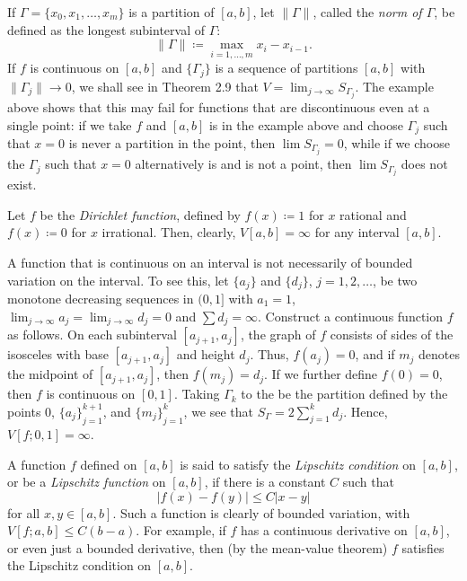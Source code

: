 If $\Gamma=\{x_0,x_1,\dotsc,x_m\}$ is a partition of $[a,b]$, let
$\|\Gamma\|$, called the \emph{norm of $\Gamma$}, be defined as the longest
subinterval of $\Gamma$:
\begin{equation}
\label{eq:eq:partition-norm}
\|\Gamma\|\coloneqq\max_{i=1,\dotsc,m} x_i-x_{i-1}.
\end{equation}
If $f$ is continuous on $[a,b]$ and $\{\Gamma_j\}$ is a sequence of
partitions $[a,b]$ with $\|\Gamma_j\|\to 0$, we shall see in Theorem 2.9
that $V=\lim_{j\to\infty} S_{\Gamma_j}$. The example above shows that this
may fail for functions that are discontinuous even at a single point: if we
take $f$ and $[a,b]$ is in the example above and choose $\Gamma_j$ such
that $x=0$ is never a partition in the point, then $\lim S_{\Gamma_j}=0$,
while if we choose the $\Gamma_j$ such that $x=0$ alternatively is and is
not a point, then $\lim S_{\Gamma_j}$ does not exist.
\begin{example}
Let $f$ be the \emph{Dirichlet function}, defined by $f(x)\coloneqq 1$ for
$x$ rational and $f(x)\coloneqq 0$ for $x$ irrational. Then, clearly,
$V[a,b]=\infty$ for any interval $[a,b]$.
\end{example}
\begin{example}
A function that is continuous on an interval is not necessarily of bounded
variation on the interval. To see this, let $\{a_j\}$ and $\{d_j\}$,
$j=1,2,\dotsc$, be two monotone decreasing sequences in $(0,1]$ with
$a_1=1$, $\lim_{j\to\infty} a_j=\lim_{j\to\infty} d_j=0$ and $\sum
d_j=\infty$. Construct a continuous function $f$ as follows. On each
subinterval $[a_{j+1},a_j]$, the graph of $f$ consists of sides of the
isosceles with base $[a_{j+1},a_j]$ and height $d_j$. Thus, $f(a_j)=0$, and
if $m_j$ denotes the midpoint of $[a_{j+1},a_j]$, then $f(m_j)=d_j$. If we
further define $f(0)=0$, then $f$ is continuous on $[0,1]$. Taking
$\Gamma_k$ to the be the partition defined by the points $0$,
${\{a_j\}}_{j=1}^{k+1}$, and ${\{m_j\}}_{j=1}^k$, we see that
$S_\Gamma=2\sum_{j=1}^k d_j$. Hence, $V[f;0,1]=\infty$.
\end{example}
\begin{example}
A function $f$ defined on $[a,b]$ is said to satisfy the \emph{Lipschitz
  condition} on $[a,b]$, or be a \emph{Lipschitz function} on $[a,b]$, if
there is a constant $C$ such that
\[
|f(x)-f(y)|\leq C|x-y|
\]
for all $x,y\in[a,b]$. Such a function is clearly of bounded variation,
with $V[f;a,b]\leq C(b-a)$. For example, if $f$ has a continuous derivative
on $[a,b]$, or even just a bounded derivative, then (by the mean-value
theorem) $f$ satisfies the Lipschitz condition on $[a,b]$.
\end{example}
